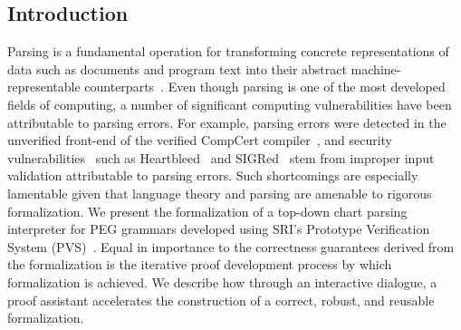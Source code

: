 \documentclass[sigplan,10pt,anonymous,review]{acmart}\settopmatter{printfolios=true,printccs=false,printacmref=false}
\begin{document}
\begin{CCSXML}


\section{Introduction}
\label{sec:intro}


Parsing is a fundamental operation for transforming concrete
representations of data such as documents and program text into their
abstract machine-representable counterparts~\cite{GruneJacobs}.  Even though parsing is
one of the most developed fields of computing, a number of significant
computing vulnerabilities have been attributable to parsing
errors. For example,  parsing errors were detected in the unverified
front-end of the verified CompCert
compiler~\cite{csmith}, and security vulnerabilities~\cite{DBLP:journals/usenix-login/BratusHHLMPS17} such as Heartbleed~\cite{carvalho2014heartbleed}  
and SIGRed~\cite{SIGRed} stem from improper input
validation attributable to parsing errors. Such shortcomings are
especially lamentable given that language theory and parsing are
amenable to rigorous formalization.   We present the formalization of a
top-down chart parsing interpreter for PEG grammars developed using
SRI's Prototype Verification System (PVS)~\cite{Owre95:prolegomena}.  Equal in importance to
the correctness guarantees derived from the formalization
is the iterative proof development process by which formalization is achieved.
We  describe how through an interactive dialogue, a proof
assistant accelerates the construction of a correct, robust, and
reusable formalization.




\end{CCSXML}
\end{document}
